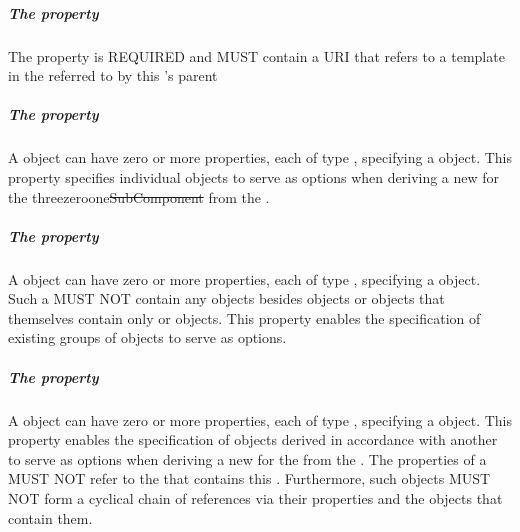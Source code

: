 \subparagraph{The  property}\label{sec:variable}

The  property is REQUIRED and MUST contain a URI that refers to a template   in the   referred to by this  's parent 


\subparagraph{The  property}\label{sec:variant}

A   object can have zero or more  properties, each of type , specifying a  object. This property specifies individual  objects to serve as options when deriving a new   for the  threezeroone{\st{SubComponent}}  from the .

\subparagraph{The  property}\label{sec:variantCollection}

A  object can have zero or more  properties, each of type , specifying a  object.
Such a  MUST NOT contain any objects besides  objects or  objects that themselves contain only  or  objects.
This property enables the specification of existing groups of  objects to serve as options.

\subparagraph{The  property}\label{sec:variantDerivation}

A  object can have zero or more  properties, each of type , specifying a  object. 
This property enables the specification of  objects derived in accordance with another  to serve as options when deriving a new  for the   from the . 
The  properties of a  MUST NOT refer to the  that contains this . 
Furthermore, such  objects MUST NOT form a cyclical chain of references via their  properties and the  objects that contain them. 


